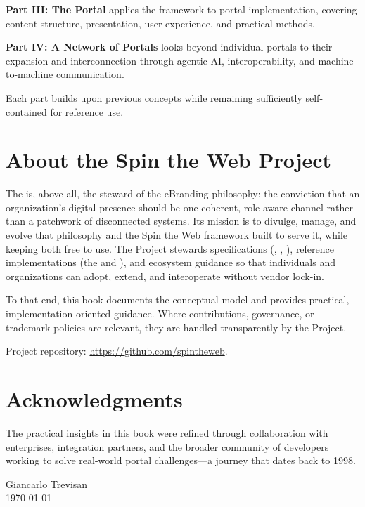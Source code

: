 \textbf{Part III: The Portal} applies the framework to portal implementation, covering content structure, presentation, user experience, and practical methods.

\textbf{Part IV: A Network of Portals} looks beyond individual portals to their expansion and interconnection through agentic AI, interoperability, and machine-to-machine communication.

Each part builds upon previous concepts while remaining sufficiently self-contained for reference use.

\section*{About the Spin the Web Project}

The \organization{} is, above all, the steward of the eBranding philosophy: the conviction that an organization's digital presence should be one coherent, role-aware channel rather than a patchwork of disconnected systems. Its mission is to divulge, manage, and evolve that philosophy and the Spin the Web framework built to serve it, while keeping both free to use. The Project stewards specifications (\wbol, \wbpl, \wbll), reference implementations (the \webspinner and \studio), and ecosystem guidance so that individuals and organizations can adopt, extend, and interoperate without vendor lock-in.

To that end, this book documents the conceptual model and provides practical, implementation-oriented guidance. Where contributions, governance, or trademark policies are relevant, they are handled transparently by the Project.

Project repository: \url{https://github.com/spintheweb}.

\section*{Acknowledgments}

The practical insights in this book were refined through collaboration with enterprises, integration partners, and the broader community of developers working to solve real-world portal challenges---a journey that dates back to 1998.

\vspace{1cm}
\nopagebreak
\hfill Giancarlo Trevisan \\
\hfill \today
